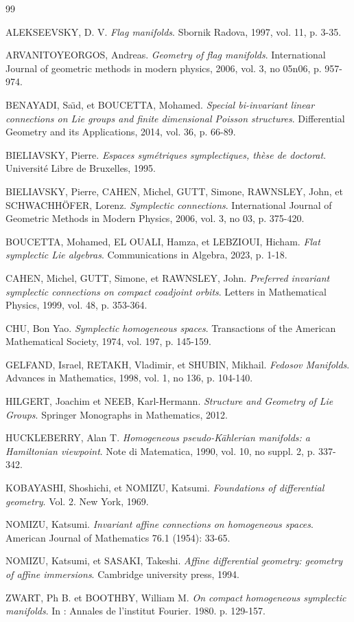 \documentclass[preprint,12pt,1p]{elsarticle}
\theoremstyle{plain}
\theoremstyle{definition}
\numberwithin{equation}{section}
\begin{document}
\begin{thebibliography}{99}

	 ALEKSEEVSKY, D. V. {\textit{Flag manifolds}}. Sbornik Radova, 1997, vol. 11, p. 3-35.
	
	 ARVANITOYEORGOS, Andreas. {\textit{Geometry of flag manifolds}}. International Journal of geometric methods in modern physics, 2006, vol. 3, no 05n06, p. 957-974.

	
	 BENAYADI, Sa{\"\i}d, et BOUCETTA, Mohamed. {\textit{Special bi-invariant linear connections on Lie groups and finite dimensional Poisson structures}}. Differential Geometry and its Applications, 2014, vol. 36, p. 66-89.
	
	 BIELIAVSKY, Pierre. {\textit{Espaces symétriques symplectiques, thèse de doctorat}}. Université Libre de Bruxelles, 1995.
	
	 BIELIAVSKY, Pierre, CAHEN, Michel, GUTT, Simone, RAWNSLEY, John, et SCHWACHH{\"O}FER, Lorenz. {\textit{Symplectic connections}}. International Journal of Geometric Methods in Modern Physics, 2006, vol. 3, no 03, p. 375-420.
	
 BOUCETTA, Mohamed, EL OUALI, Hamza, et LEBZIOUI, Hicham. {\textit{Flat symplectic Lie algebras}}. Communications in Algebra, 2023, p. 1-18.
	
	 CAHEN, Michel, GUTT, Simone, et RAWNSLEY, John. {\textit{Preferred invariant symplectic connections on compact coadjoint orbits}}. Letters in Mathematical Physics, 1999, vol. 48, p. 353-364.
	
	 CHU, Bon Yao. {\textit{Symplectic homogeneous spaces}}. Transactions of the American Mathematical Society, 1974, vol. 197, p. 145-159.

	 GELFAND, Israel, RETAKH, Vladimir, et SHUBIN, Mikhail. {\textit{Fedosov Manifolds}}. Advances in Mathematics, 1998, vol. 1, no 136, p. 104-140.
	
	 HILGERT, Joachim et NEEB, Karl-Hermann. {\textit{Structure and Geometry of Lie Groups}}. Springer Monographs in Mathematics, 2012.
	
	 HUCKLEBERRY, Alan T. {\textit{Homogeneous pseudo-Kählerian manifolds: a Hamiltonian viewpoint}}. Note di Matematica, 1990, vol. 10, no suppl. 2, p. 337-342.

	 KOBAYASHI, Shoshichi, et NOMIZU, Katsumi. {\textit{Foundations of differential geometry}}. Vol. 2. New York, 1969.

		NOMIZU, Katsumi. {\textit{Invariant affine connections on homogeneous spaces}}. American Journal of Mathematics 76.1 (1954): 33-65.
	
	
	 NOMIZU, Katsumi, et SASAKI, Takeshi. {\textit{Affine differential geometry: geometry of affine immersions}}. Cambridge university press, 1994.

	 ZWART, Ph B. et BOOTHBY, William M. {\textit{On compact homogeneous symplectic manifolds}}. In : Annales de l'institut Fourier. 1980. p. 129-157.
	 

\end{thebibliography}
\end{document}
